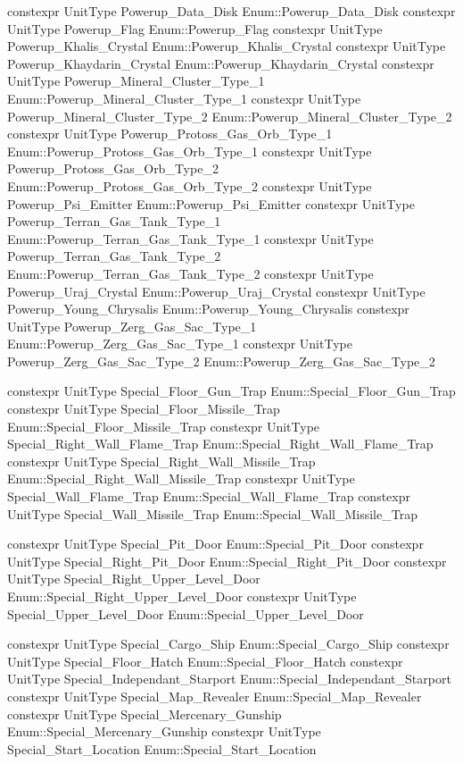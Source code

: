 \begin{codebox}[变量(增益)]
constexpr UnitType Powerup_Data_Disk {Enum::Powerup_Data_Disk}
constexpr UnitType Powerup_Flag {Enum::Powerup_Flag}
constexpr UnitType Powerup_Khalis_Crystal {Enum::Powerup_Khalis_Crystal}
constexpr UnitType Powerup_Khaydarin_Crystal {Enum::Powerup_Khaydarin_Crystal}
constexpr UnitType Powerup_Mineral_Cluster_Type_1 {Enum::Powerup_Mineral_Cluster_Type_1}
constexpr UnitType Powerup_Mineral_Cluster_Type_2 {Enum::Powerup_Mineral_Cluster_Type_2}
constexpr UnitType Powerup_Protoss_Gas_Orb_Type_1 {Enum::Powerup_Protoss_Gas_Orb_Type_1}
constexpr UnitType Powerup_Protoss_Gas_Orb_Type_2 {Enum::Powerup_Protoss_Gas_Orb_Type_2}
constexpr UnitType Powerup_Psi_Emitter {Enum::Powerup_Psi_Emitter}
constexpr UnitType Powerup_Terran_Gas_Tank_Type_1 {Enum::Powerup_Terran_Gas_Tank_Type_1}
constexpr UnitType Powerup_Terran_Gas_Tank_Type_2 {Enum::Powerup_Terran_Gas_Tank_Type_2}
constexpr UnitType Powerup_Uraj_Crystal {Enum::Powerup_Uraj_Crystal}
constexpr UnitType Powerup_Young_Chrysalis {Enum::Powerup_Young_Chrysalis}
constexpr UnitType Powerup_Zerg_Gas_Sac_Type_1 {Enum::Powerup_Zerg_Gas_Sac_Type_1}
constexpr UnitType Powerup_Zerg_Gas_Sac_Type_2 {Enum::Powerup_Zerg_Gas_Sac_Type_2}
\end{codebox}
\begin{codebox}[变量(陷阱)]
constexpr UnitType Special_Floor_Gun_Trap {Enum::Special_Floor_Gun_Trap}
constexpr UnitType Special_Floor_Missile_Trap {Enum::Special_Floor_Missile_Trap}
constexpr UnitType Special_Right_Wall_Flame_Trap {Enum::Special_Right_Wall_Flame_Trap}
constexpr UnitType Special_Right_Wall_Missile_Trap {Enum::Special_Right_Wall_Missile_Trap}
constexpr UnitType Special_Wall_Flame_Trap {Enum::Special_Wall_Flame_Trap}
constexpr UnitType Special_Wall_Missile_Trap {Enum::Special_Wall_Missile_Trap}
\end{codebox}
\begin{codebox}[变量(门)]
constexpr UnitType Special_Pit_Door {Enum::Special_Pit_Door}
constexpr UnitType Special_Right_Pit_Door {Enum::Special_Right_Pit_Door}
constexpr UnitType Special_Right_Upper_Level_Door {Enum::Special_Right_Upper_Level_Door}
constexpr UnitType Special_Upper_Level_Door {Enum::Special_Upper_Level_Door}
\end{codebox}
\begin{codebox}[变量(特殊)]
constexpr UnitType Special_Cargo_Ship {Enum::Special_Cargo_Ship}
constexpr UnitType Special_Floor_Hatch {Enum::Special_Floor_Hatch}
constexpr UnitType Special_Independant_Starport {Enum::Special_Independant_Starport}
constexpr UnitType Special_Map_Revealer {Enum::Special_Map_Revealer}
constexpr UnitType Special_Mercenary_Gunship {Enum::Special_Mercenary_Gunship}
constexpr UnitType Special_Start_Location {Enum::Special_Start_Location}
\end{codebox}

